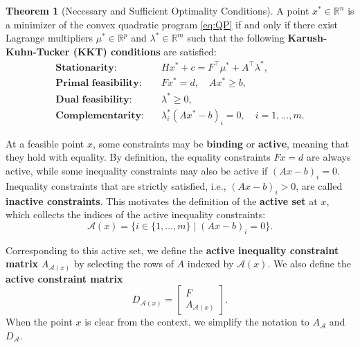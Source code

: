 \documentclass{book}
\theoremstyle{definition}
\newtheorem{theorem}{Theorem}[section]
\numberwithin{algorithm_}{chapter}
\begin{document}
\begin{theorem}[Necessary and Sufficient Optimality Conditions] \label{th:optimalityQP}
A point \(x^* \in \mathbb{R}^n\) is a minimizer of the convex quadratic program \eqref{eq:QP} if and only if there exist Lagrange multipliers \(\mu^* \in \mathbb{R}^p\) and \(\lambda^* \in \mathbb{R}^m\) such that the following \textbf{Karush-Kuhn-Tucker (KKT) conditions} are satisfied:
\begin{subequations}
\begin{align}
\textbf{Stationarity:} \quad & H x^* + c = F^\top \mu^* +  A^\top \lambda^*, \label{KKT:stationarity} \\[1mm]
\textbf{Primal feasibility:} \quad & F x^* = d, \quad A x^* \ge b, \label{KKT:primal} \\[1mm]
\textbf{Dual feasibility:} \quad & \lambda^* \ge 0, \label{KKT:dual} \\[1mm]
\textbf{Complementarity:} \quad & \lambda_i^* (A x^* - b)_i = 0, \quad i = 1, \dots, m. \label{KKT:complementarity}
\end{align}
\end{subequations}

\end{theorem}

\bigskip

At a feasible point \(x\), some constraints may be \textbf{binding} or \textbf{active}, meaning that they hold with equality. By definition, the equality constraints \(F x = d\) are always active, while some inequality constraints may also be active if 
\((A x - b)_i = 0\). Inequality constraints that are strictly satisfied, i.e., \((A x - b)_i > 0\), are called \textbf{inactive constraints}. This motivates the definition of the \textbf{active set} at \(x\), which collects the indices of the active inequality constraints:
\[
\mathcal{A}(x) = \{ i \in \{1, \dots, m\} \mid (A x - b)_i = 0 \}.
\]

Corresponding to this active set, we define the \textbf{active inequality constraint matrix} \(A_{\mathcal{A}(x)}\) by selecting the rows of \(A\) indexed by \(\mathcal{A}(x)\). We also define the \textbf{active constraint matrix}
\[
D_{\mathcal{A}(x)} =
\begin{bmatrix}
F \\[1mm]
A_{\mathcal{A}(x)}
\end{bmatrix}.
\]
When the point \(x\) is clear from the context, we simplify the notation to \(A_{\mathcal{A}}\) and \(D_{\mathcal{A}}\). 

\bigskip
\end{document}
